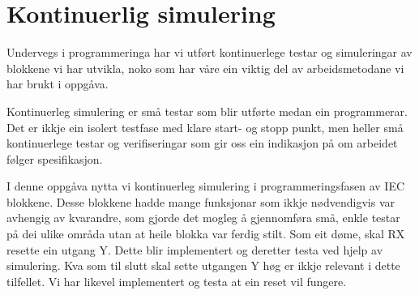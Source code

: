 \section{Kontinuerlig simulering}
\thispagestyle{fancy}

Undervegs i programmeringa har vi utført kontinuerlege testar og simuleringar av blokkene vi har utvikla, noko
som har våre ein viktig del av arbeidsmetodane vi har brukt i oppgåva. 

Kontinuerleg simulering er små testar som blir utførte medan ein programmerar.
Det er ikkje ein isolert testfase med klare start- og stopp punkt, men heller små kontinuerlege testar og verifiseringar som gir oss ein indikasjon
på om arbeidet følger spesifikasjon.

I denne oppgåva nytta vi kontinuerleg simulering i programmeringsfasen av \gls{IEC} blokkene.
Desse blokkene hadde mange funksjonar som ikkje nødvendigvis var avhengig av kvarandre,
som gjorde det mogleg å gjennomføra små, enkle testar på dei ulike områda utan at heile blokka var ferdig stilt.\newline
Som eit døme, skal \gls{RX} resette ein utgang \gls{Y}. Dette blir implementert og deretter testa ved hjelp av simulering.
Kva som til slutt skal sette utgangen \gls{Y} høg er ikkje relevant i dette tilfellet. Vi har likevel implementert 
og testa at ein reset vil fungere.



\newpage
